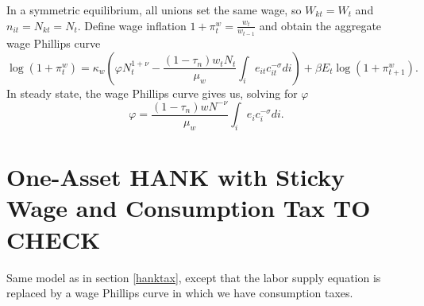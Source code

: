 \documentclass[11pt,a4paper]{article}
\begin{document}
In a symmetric equilibrium, all unions set the same wage, so $W_{kt}=W_t$ and $n_{it}=N_{kt}=N_t$. Define wage inflation $1+\pi_t^w=\frac{w_t}{w_{t-1}}$ and obtain the aggregate wage Phillips curve
\begin{equation*}
\log(1+\pi_t^w)=\kappa_w\left(\varphi N_{t}^{1+\nu}-\frac{(1-\tau_n)w_tN_t}{\mu_w}\int_i e_{it}c_{it}^{-\sigma}di\right)+\beta E_t\log(1+\pi_{t+1}^w).
\end{equation*}
In steady state, the wage Phillips curve gives us, solving for $\varphi$
\begin{equation*}
\varphi=\frac{(1-\tau_n)wN^{-\nu}}{\mu_w}\int_{i}e_{i}c_{i}^{-\sigma}di.
\end{equation*}



\section{One-Asset HANK with Sticky Wage and Consumption Tax TO CHECK}
Same model as in section \ref{hanktax}, except that the labor supply equation is replaced by a wage Phillips curve in which we have consumption taxes.
\end{document}
